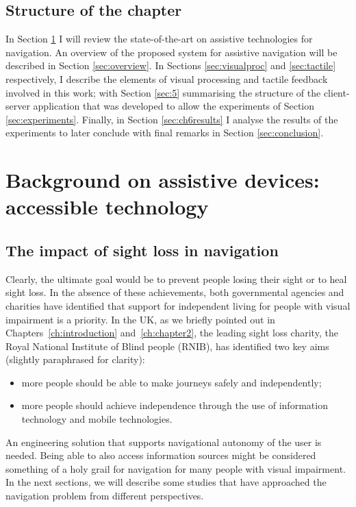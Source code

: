 \subsection{Structure of the chapter}

In Section \ref{sec:2} I will review the state-of-the-art on assistive technologies for navigation. An overview of the proposed system for assistive navigation will be described in Section \ref{sec:overview}. In Sections \ref{sec:visualproc} and \ref{sec:tactile} respectively, I describe the elements of visual processing and tactile feedback involved in this work; with Section \ref{sec:5} summarising the structure of the client-server application that was developed to allow the experiments of Section \ref{sec:experiments}. Finally, in Section \ref{sec:ch6results} I analyse the results of the experiments to later conclude with final remarks in Section \ref{sec:conclusion}.

\section{Background on assistive devices: accessible technology}
\label{sec:2}

\subsection{The impact of sight loss in navigation}

Clearly, the ultimate goal would be to prevent people losing their sight or to heal sight loss. In the absence of these achievements, both governmental agencies and charities have identified that support for independent living for people with visual impairment is a priority. In the UK, as we briefly pointed out in Chapters~\ref{ch:introduction} and~\ref{ch:chapter2}, the leading sight loss charity, the Royal National Institute of Blind people (RNIB), has identified two key aims \citep{RNIB2009} (slightly paraphrased for clarity): 
\begin{itemize}
\item more people should be able to make journeys safely and independently; 
\item more people should achieve independence through the use of information technology and mobile technologies.
\end{itemize}

An engineering solution that supports navigational autonomy of the user is needed. Being able to also access information sources might be considered something of a holy grail for navigation for many people with visual impairment. In the next sections, we will describe some studies that have approached the navigation problem from different perspectives.

